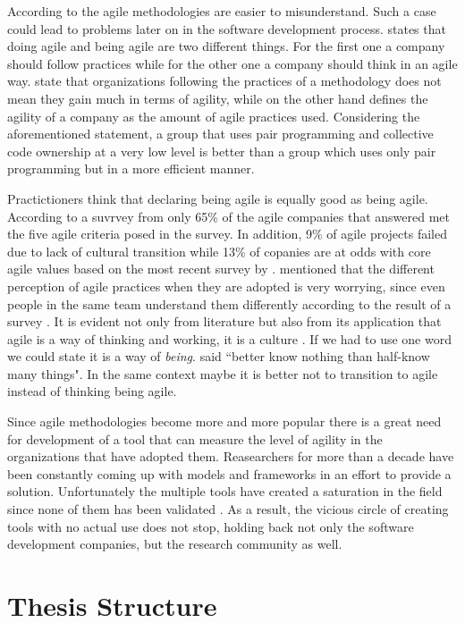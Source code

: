 According to \citet{6427226} the agile methodologies are easier to misunderstand. Such a case could lead to problems later on in the software development process. \citet{sahota} states that doing agile and being agile are two different things. For the first one a company should follow practices while for the other one a company should think in an agile way. \citet{lappoA04} state that organizations following the practices of a methodology does not mean they gain much in terms of agility, while on the other hand \citet{sidky_dissertation} defines the agility of a company as the amount of agile practices used. Considering the aforementioned statement, a group that uses pair programming and collective code ownership at a very low level is better than a group which uses only pair programming but in a more efficient manner.

Practictioners think that declaring being agile is equally good as being agile. According to a suvrvey from \citet{ambysoft} only 65\% of the agile companies that answered met the five agile criteria posed in the survey. In addition, 9\% of agile projects failed due to lack of cultural transition while 13\% of copanies are at odds with core agile values based on the most recent survey by \citet{versionOne}. \citet{poonacha} mentioned that the different perception of agile practices when they are adopted is very worrying, since even people in the same team understand them differently according to the result of a survey \cite{ambler}. It is evident not only from literature but also from its application that agile is a way of thinking and working, it is a culture \cite{poonacha}. If we had to use one word we could state it is a way of \textit{being}. \citet{Nietzsche} said ``better know nothing than half-know many things". In the same context maybe it is better not to transition to agile instead of thinking being agile. 

Since agile methodologies become more and more popular there is a great need for development of a tool that can measure the level of agility in the organizations that have adopted them. Reasearchers for more than a decade have been constantly coming up with models and frameworks in an effort to provide a solution. Unfortunately the multiple tools have created a saturation in the field since none of them has been validated \cite{samireh_jalali_dissertation}. As a result, the vicious circle of creating tools with no actual use does not stop, holding back not only the software development companies, but the research community as well.


\section{Thesis Structure}




